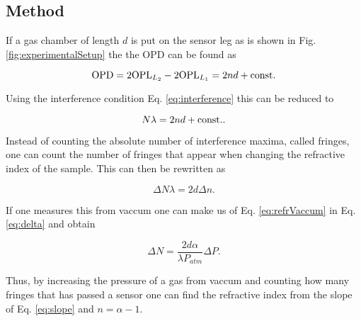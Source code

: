\subsection{Method}

If a gas chamber of length $d$ is put on the sensor leg as is shown in Fig. \ref{fig:experimentalSetup} the the OPD can be found as

\begin{equation}
  \label{eq:OPD}
  \textnormal{OPD} = 2\textnormal{OPL}_{L_2} - 2\textnormal{OPL}_{L_1} = 2nd + \textnormal{const.}
\end{equation}

Using the interference condition Eq. \eqref{eq:interference} this can be reduced to

\begin{equation*}
  N \lambda = 2nd + \textnormal{const.}.
\end{equation*}

Instead of counting the absolute number of interference maxima, called fringes, one can count the number of fringes that appear when changing the refractive index of the sample. This can then be rewritten as

\begin{equation}
\label{eq:delta}
  \Delta N \lambda = 2d \Delta n.
\end{equation}

If one measures this from vaccum one can make us of Eq. \eqref{eq:refrVaccum} in Eq. \eqref{eq:delta} and obtain

\begin{equation}
\label{eq:slope}
  \Delta N = \frac{2d\alpha}{\lambda P_{atm}} \Delta P.
\end{equation}

Thus, by increasing the pressure of a gas from vaccum and counting how many fringes that has passed a sensor one can find the refractive index from the slope of Eq. \eqref{eq:slope} and $n=\alpha-1$.

